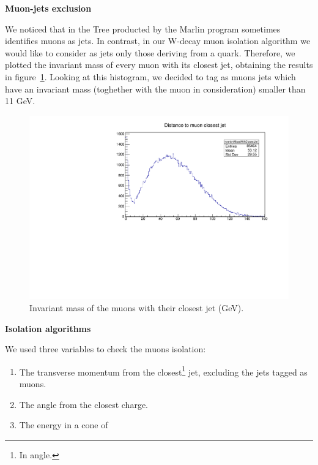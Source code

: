 \textbf{Muon-jets exclusion}

We noticed that in the Tree producted by the Marlin program sometimes identifies muons as jets. In contrast, in our W-decay muon isolation algorithm we would like to consider as jets only those deriving from a quark. Therefore, we plotted the invariant mass of every muon with its closest jet, obtaining the results in figure~\ref{04_muonJetInvariantMass}. Looking at this histogram, we decided to tag as muons jets which have an invariant mass (toghether with the muon in consideration) smaller than 11 GeV.

\begin{figure} [htp]
\centering
\includegraphics[scale=0.7]{04_muonJetInvariantMass.pdf}
\caption{Invariant mass of the muons with their closest jet (GeV).}
\label{04_muonJetInvariantMass}
\end{figure}

\textbf{Isolation algorithms}

We used three variables to check the muons isolation:

\begin{enumerate}
\item The transverse momentum from the closest\footnote{In angle.} jet, excluding the jets tagged as muons. 
\item The angle from the closest charge.
\item The energy in a cone of
\end{enumerate}
